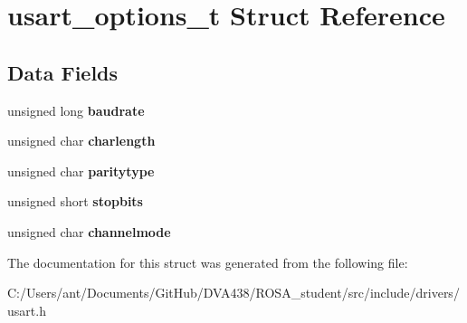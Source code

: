 \hypertarget{structusart__options__t}{}\section{usart\+\_\+options\+\_\+t Struct Reference}
\label{structusart__options__t}
\subsection*{Data Fields}
\begin{DoxyCompactItemize}
\item 
\mbox{\label{structusart__options__t_a48e3e204af5eb4ace8224a6765899a14}} 
unsigned long {\bfseries baudrate}
\item 
\mbox{\label{structusart__options__t_adb9bc2c80e9fcaee6d60f2cd1657d27d}} 
unsigned char {\bfseries charlength}
\item 
\mbox{\label{structusart__options__t_aa5776192a0b4392879df6ebaad821459}} 
unsigned char {\bfseries paritytype}
\item 
\mbox{\label{structusart__options__t_a2f7b3610a4547f7aadc0ad414e9aadc0}} 
unsigned short {\bfseries stopbits}
\item 
\mbox{\label{structusart__options__t_a2c615c1bf7ab4d2635f3760f63ab15f7}} 
unsigned char {\bfseries channelmode}
\end{DoxyCompactItemize}


The documentation for this struct was generated from the following file\+:\begin{DoxyCompactItemize}
\item 
C\+:/\+Users/ant/\+Documents/\+Git\+Hub/\+D\+V\+A438/\+R\+O\+S\+A\+\_\+student/src/include/drivers/usart.\+h\end{DoxyCompactItemize}

